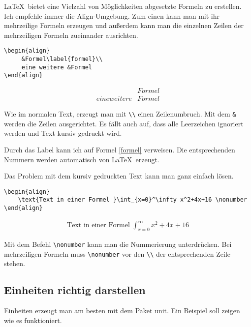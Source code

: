 \LaTeX\ bietet eine Vielzahl von Möglichkeiten abgesetzte Formeln zu erstellen. Ich empfehle immer die Align-Umgebung. Zum einen kann man mit ihr mehrzeilige Formeln erzeugen und außerdem kann man die einzelnen Zeilen der mehrzeiligen Formeln zueinander ausrichten.

\begin{verbatim}
\begin{align}
     &Formel\label{formel}\\
     eine weitere &Formel
\end{align}
\end{verbatim}

\begin{align}
    &Formel\label{formel}\\
    eine weitere &Formel
\end{align}

Wie im normalen Text, erzeugt man mit \verb+\\+ einen Zeilenumbruch. Mit dem \verb+&+ werden die Zeilen ausgerichtet. Es fällt auch auf, dass alle Leerzeichen ignoriert werden und Text kursiv gedruckt wird.

Durch das Label kann ich auf Formel \ref{formel} verweisen. Die entsprechenden Nummern werden automatisch von \LaTeX\ erzeugt.

Das Problem mit dem kursiv gedruckten Text kann man ganz einfach lösen.

\begin{verbatim}
\begin{align}
    \text{Text in einer Formel }\int_{x=0}^\infty x^2+4x+16 \nonumber
\end{align}
\end{verbatim}

\begin{align}
    \text{Text in einer Formel }\int_{x=0}^\infty x^2+4x+16 \nonumber
\end{align}

Mit dem Befehl \verb+\nonumber+ kann man die Nummerierung unterdrücken. Bei mehrzeiligen Formeln muss \verb+\nonumber+ vor den \verb+\\+ der entsprechenden Zeile stehen.

\subsection{Einheiten richtig darstellen}

Einheiten erzeugt man am besten mit dem Paket unit. Ein Beispiel soll zeigen wie es funktioniert.

